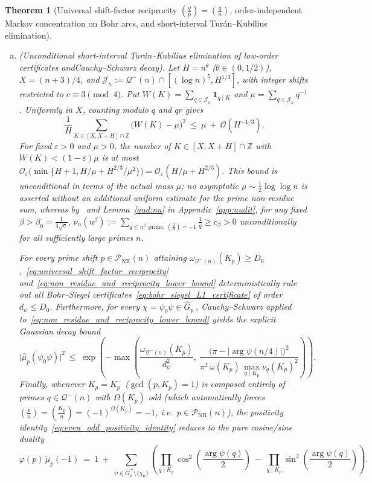 \documentclass[11pt, a4paper]{article}
\theoremstyle{plain}
\newtheorem{theorem}{Theorem}[section]
\theoremstyle{definition}
\newcommand{\Z}{\mathbb{Z}}
\newcommand{\leg}[2]{\left(\frac{#1}{#2}\right)}
\begin{document}
\begin{theorem}[Universal shift-factor reciprocity $\leg{q}{p}=\leg{q}{n}$, order-independent Markov concentration on Bohr arcs, and short-interval Tur\'{a}n--Kubilius elimination]
\begin{enumerate}[(a)]
    \item \emph{(Unconditional short-interval Tur\'{a}n--Kubilius elimination of low-order certificates and\linebreak Cauchy--Schwarz decay).} Let $H=n^{\theta}$ ($\theta\in(0,1/2)$), $X=(n+3)/4$, and $\mathcal{J}_n:=\mathcal{Q}^{-}(n)\cap[(\log n)^{5},H^{1/3}]$, with integer shifts restricted to $c\equiv3\pmod4$. Put $W(K)=\sum_{q\in\mathcal J_n}\mathbf1_{q\mid K}$ and $\mu=\sum_{q\in\mathcal J_n}q^{-1}$. Uniformly in $X$, counting modulo $q$ and $qr$ gives
    \[
    \frac1H\sum_{K\in[X,X+H]\cap\mathbb Z}\big(W(K)-\mu\big)^2\ \le\ \mu\ +\ \mathcal{O}(H^{-1/3}).
    \]
    For fixed $\varepsilon>0$ and $\mu>0$, the number of $K\in[X,X+H]\cap\Z$ with $W(K)<(1-\varepsilon)\mu$ is at most $\mathcal{O}_\varepsilon\!\big(\min\{H+1,H/\mu+H^{2/3}/\mu^2\}\big)=\mathcal{O}_\varepsilon(H/\mu+H^{2/3})$. This bound is unconditional in terms of the actual mass $\mu$; no asymptotic $\mu\sim\frac12\log\log n$ is asserted without an additional uniform estimate for the prime non-residue sum, whereas by~\cite{BGHS} and Lemma~\ref{aud:nu} in Appendix~\ref{app:audit}, for any fixed $\beta>\beta_0=\frac{1}{4\sqrt{e}}$, $\nu_n(n^{\beta}):=\sum_{q\le n^{\beta}\text{ prime},\,\leg{q}{n}=-1}\frac1q\ge c_{\beta}>0$ unconditionally for all sufficiently large primes $n$.

    For every prime shift $p\in\mathcal{P}_{\mathrm{NR}}(n)$ attaining $\omega_{\mathcal{Q}^{-}(n)}(K_p)\ge D_0$,~\eqref{eq:universal_shift_factor_reciprocity} and~\eqref{eq:non_residue_and_reciprocity_lower_bound} deterministically rule out all Bohr--Siegel certificates~\eqref{eq:bohr_siegel_L1_certificate} of order $d_{\psi}\le D_0$. Furthermore, for every $\chi=\psi_0\psi\in\widehat{G}_p^{-}$, Cauchy--Schwarz applied to~\eqref{eq:non_residue_and_reciprocity_lower_bound} yields the explicit Gaussian decay bound
    \begin{equation}\label{eq:cauchy_schwarz_gaussian_decay}
    \big|\widehat{\mu}_p(\psi_0\psi)\big|^{2}\ \le\ \exp\!\left(-\max\!\left(\frac{\omega_{\mathcal{Q}^{-}(n)}(K_p)}{d_{\psi}^{2}},\ \frac{\big(\pi-|\arg\psi(n/4)|\big)^{2}}{\pi^{2}\,\omega(K_p)\,\max_{q\mid K_p}\nu_q(K_p)^{2}}\right)\right).
    \end{equation}
    Finally, whenever $K_p=K_p^{-}$ ($\gcd(p,K_p)=1$) is composed entirely of primes $q\in\mathcal{Q}^{-}(n)$ with $\Omega(K_p)$ odd (which automatically forces $\leg{p}{n}=\leg{K_p}{n}=(-1)^{\Omega(K_p)}=-1$, i.e.\ $p\in\mathcal{P}_{\mathrm{NR}}(n)$), the positivity identity~\eqref{eq:even_odd_positivity_identity} reduces to the pure cosine/sine duality
    \[
    \varphi(p)\,\widetilde{\mu}_p(-1)\ =\ 1\ +\ \sum_{\psi\in\widehat{G}_p^{+}\setminus\{\chi_0\}}\left(\prod_{q\mid K_p}\cos^{2}\!\left(\frac{\arg\psi(q)}{2}\right)\ -\ \prod_{q\mid K_p}\sin^{2}\!\left(\frac{\arg\psi(q)}{2}\right)\right).
    \]
\end{enumerate}
\end{theorem}
\end{document}

